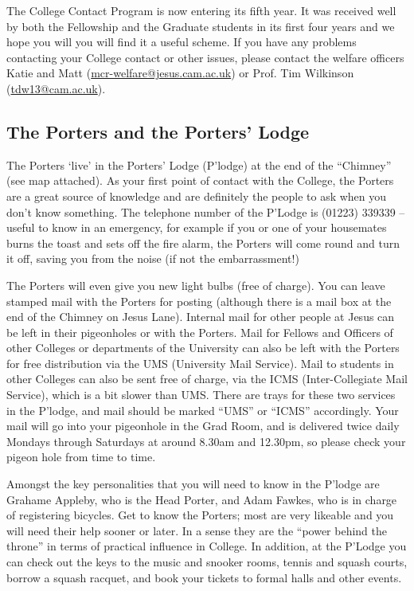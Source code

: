 \documentclass[11pt,fleqn, oneside]{book} %
\begin{document}
The College Contact Program is now entering its fifth year. It was received well by both the Fellowship and the Graduate students in its first four years and we hope you will you will find it a useful scheme. If you have any problems contacting your College contact or other issues, please contact the welfare officers Katie and Matt (\url{mcr-welfare@jesus.cam.ac.uk}) or Prof. Tim Wilkinson (\url{tdw13@cam.ac.uk}).  

\subsection{The Porters and the Porters’ Lodge}

The Porters ‘live’ in the Porters’ Lodge (P’lodge) at the end of the “Chimney” (see map attached). As your first point of contact with the College, the Porters are a great source of knowledge and are definitely the people to ask when you don't know something. The telephone number of the P’Lodge is (01223) 339339 – useful to know in an emergency, for example if you or one of your housemates burns the toast and sets off the fire alarm, the Porters will come round and turn it off, saving you from the noise (if not the embarrassment!)

The Porters will even give you new light bulbs (free of charge). You can leave stamped mail with the Porters for posting (although there is a mail box at the end of the Chimney on Jesus Lane). Internal mail for other people at Jesus can be left in their pigeonholes or with the Porters. Mail for Fellows and Officers of other Colleges or departments of the University can also be left with the Porters for free distribution via the UMS (University Mail Service). Mail to students in other Colleges can also be sent free of charge, via the ICMS (Inter-Collegiate Mail Service), which is a bit slower than UMS. There are trays for these two services in the P’lodge, and mail should be marked “UMS” or “ICMS” accordingly. Your mail will go into your pigeonhole in the Grad Room, and is delivered twice daily Mondays through Saturdays at around 8.30am and 12.30pm, so please check your pigeon hole from time to time.

Amongst the key personalities that you will need to know in the P’lodge are Grahame Appleby, who is the Head Porter, and Adam Fawkes, who is in charge of registering bicycles.  Get to know the Porters; most are very likeable and you will need their help sooner or later. In a sense they are the “power behind the throne” in terms of practical influence in College. In addition, at the P’Lodge you can check out the keys to the music and snooker rooms, tennis and squash courts, borrow a squash racquet, and book your tickets to formal halls and other events. 
\end{document}
